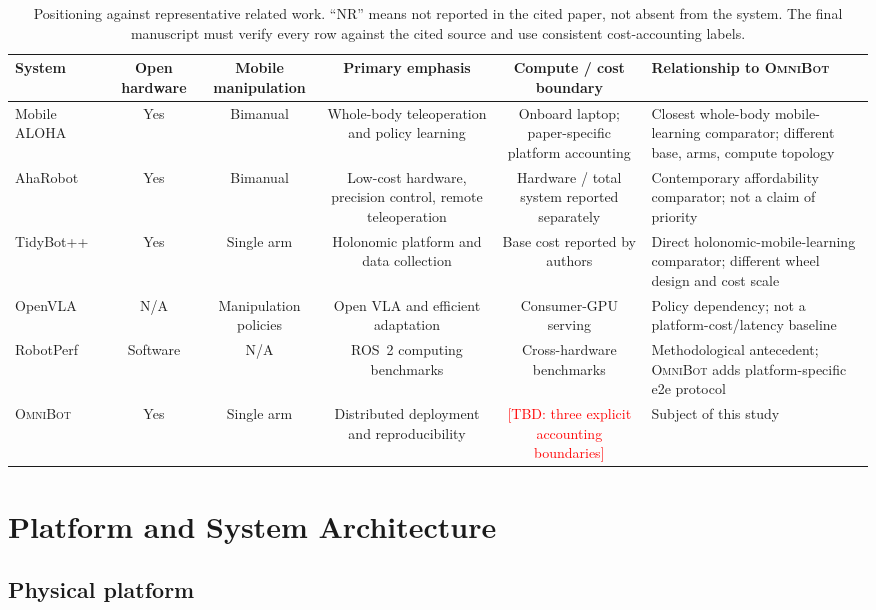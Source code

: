 \documentclass[letterpaper,10pt,conference]{ieeeconf}
\newcommand{\TBD}[1]{\textcolor{red}{[TBD: #1]}}
\newcommand{\OmniBot}{\textsc{OmniBot}}
\begin{document}
\begin{table}[t]
\caption{Positioning against representative related work. ``NR'' means not reported in the cited paper, not absent from the system. The final manuscript must verify every row against the cited source and use consistent cost-accounting labels.}
\label{tab:comparison}
\centering
\small
\begin{tabularx}{\textwidth}{l c c c c X}
\toprule
System & Open hardware & Mobile manipulation & Primary emphasis & Compute / cost boundary & Relationship to \OmniBot{} \\
\midrule
Mobile ALOHA~\cite{fu2024mobile} & Yes & Bimanual & Whole-body teleoperation and policy learning & Onboard laptop; paper-specific platform accounting & Closest whole-body mobile-learning comparator; different base, arms, compute topology \\
AhaRobot~\cite{cui2025aharobot} & Yes & Bimanual & Low-cost hardware, precision control, remote teleoperation & Hardware / total system reported separately & Contemporary affordability comparator; not a claim of priority \\
TidyBot++~\cite{wu2025tidybot} & Yes & Single arm & Holonomic platform and data collection & Base cost reported by authors & Direct holonomic-mobile-learning comparator; different wheel design and cost scale \\
OpenVLA~\cite{kim2025openvla} & N/A & Manipulation policies & Open VLA and efficient adaptation & Consumer-GPU serving & Policy dependency; not a platform-cost/latency baseline \\
RobotPerf~\cite{robotperf2024} & Software & N/A & ROS~2 computing benchmarks & Cross-hardware benchmarks & Methodological antecedent; \OmniBot{} adds platform-specific e2e protocol \\
\OmniBot{} & Yes & Single arm & Distributed deployment and reproducibility & \TBD{three explicit accounting boundaries} & Subject of this study \\
\bottomrule
\end{tabularx}
\end{table}

\section{Platform and System Architecture}
\label{sec:system}

\subsection{Physical platform}
\end{document}
